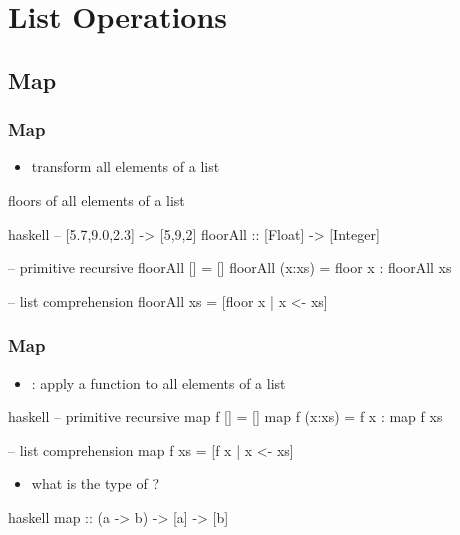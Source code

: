 \documentclass[dvipsnames]{beamer}
\theoremstyle{plain}
\begin{document}
\section{List Operations}

\subsection{Map}

\begin{frame}[fragile]
  \frametitle{Map}

  \begin{itemize}
    \item transform all elements of a list
  \end{itemize}

  \begin{exampleblock}{floors of all elements of a list}
    \begin{pygments}{haskell}
-- [5.7,9.0,2.3] -> [5,9,2]
floorAll :: [Float] -> [Integer]

-- primitive recursive
floorAll []     = []
floorAll (x:xs) = floor x : floorAll xs

-- list comprehension
floorAll xs = [floor x | x <- xs]
    \end{pygments}
  \end{exampleblock}
\end{frame}

\begin{frame}[fragile]
  \frametitle{Map}

  \begin{itemize}
    \item {}: apply a function to all elements of a list
  \end{itemize}

  \begin{exampleblock}{}
    \begin{pygments}{haskell}
-- primitive recursive
map f []     = []
map f (x:xs) = f x : map f xs

-- list comprehension
map f xs = [f x | x <- xs]
    \end{pygments}
  \end{exampleblock}

  \pause
  \begin{itemize}
    \item what is the type of ?
  \end{itemize}

  \begin{pygments}{haskell}
map :: (a -> b) -> [a] -> [b]
  \end{pygments}
\end{frame}
\end{document}

